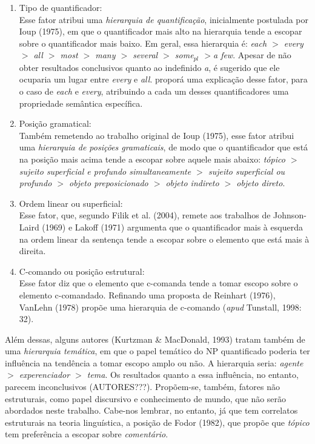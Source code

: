 \begin{enumerate}
    \item Tipo de quantificador:\\
    Esse fator atribui uma \emph{hierarquia de quantificação}, inicialmente postulada por Ioup (1975), em que o quantificador mais alto na hierarquia tende a escopar sobre o quantificador mais baixo. Em geral, essa hierarquia é: \emph{each $>$ every $>$ all $>$ most $>$ many $>$ several $>$ some$_{pl}$ $>$a few}. Apesar de não obter resultados conclusivos quanto ao indefinido \emph{a}, é sugerido que ele ocuparia um lugar entre \emph{every} e \emph{all}.  proporá uma explicação desse fator, para o caso de \emph{each} e \emph{every}, atribuindo a cada um desses quantificadores uma propriedade semântica específica.
    \item Posição gramatical:\\
    Também remetendo ao trabalho original de Ioup (1975), esse fator atribui uma \emph{hierarquia de posições gramaticais}, de modo que o quantificador que está na posição mais acima tende a escopar sobre aquele mais abaixo: \emph{tópico $>$ sujeito superficial e profundo simultaneamente $>$ sujeito superficial ou profundo $>$ objeto preposicionado $>$ objeto indireto $>$ objeto direto}.
    \item Ordem linear ou superficial: \\
    Esse fator, que, segundo Filik et al. (2004), remete aos trabalhos de Johnson-Laird (1969) e Lakoff (1971) argumenta que o quantificador mais à esquerda na ordem linear da sentença tende a escopar sobre o elemento que está mais à direita.
    \item C-comando ou posição estrutural: \\
    Esse fator diz que o elemento que c-comanda tende a tomar escopo sobre o elemento c-comandado. Refinando uma proposta de Reinhart (1976), VanLehn (1978) propõe uma hierarquia de c-comando (\emph{apud} Tunstall, 1998: 32).
\end{enumerate}

Além dessas, alguns autores (Kurtzman \& MacDonald, 1993) tratam também de uma \emph{hierarquia temática}, em que o papel temático do NP quantificado poderia ter influência na tendência a tomar escopo amplo ou não. A hierarquia seria: \emph{agente $>$ experenciador $>$ tema}. Os resultados quanto a essa influência, no entanto, parecem inconclusivos (AUTORES???). Propõem-se, também, fatores não estruturais, como papel discursivo e conhecimento de mundo, que não serão abordados neste trabalho. Cabe-nos lembrar, no entanto, já que tem correlatos estruturais na teoria linguística, a posição de Fodor (1982), que propõe que \emph{tópico} tem preferência a escopar sobre \emph{comentário}.

